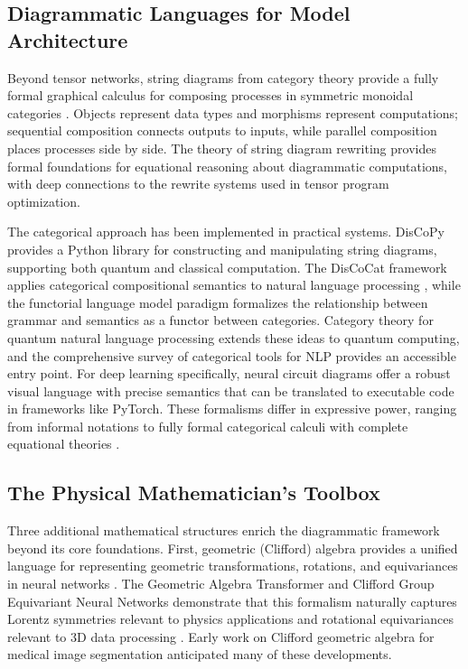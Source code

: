 \documentclass[12pt,a4paper]{article}
\begin{document}
\subsection{Diagrammatic Languages for Model Architecture}

Beyond tensor networks, string diagrams from category theory provide a fully formal graphical calculus for composing processes in symmetric monoidal categories \cite{marsden2014category}. Objects represent data types and morphisms represent computations; sequential composition connects outputs to inputs, while parallel composition places processes side by side. The theory of string diagram rewriting \cite{acclaviondstring} provides formal foundations for equational reasoning about diagrammatic computations, with deep connections to the rewrite systems used in tensor program optimization.

The categorical approach has been implemented in practical systems. DisCoPy \cite{toumi2022discopy} provides a Python library for constructing and manipulating string diagrams, supporting both quantum and classical computation. The DisCoCat framework applies categorical compositional semantics to natural language processing \cite{sadrzadeh2016quantifier, kartsaklis2016coordination}, while the functorial language model paradigm \cite{toumi2021functorial} formalizes the relationship between grammar and semantics as a functor between categories. Category theory for quantum natural language processing \cite{toumi2022category} extends these ideas to quantum computing, and the comprehensive survey of categorical tools for NLP \cite{felice2022categorical} provides an accessible entry point. For deep learning specifically, neural circuit diagrams \cite{abbott2024neural} offer a robust visual language with precise semantics that can be translated to executable code in frameworks like PyTorch. These formalisms differ in expressive power, ranging from informal notations to fully formal categorical calculi with complete equational theories \cite{bonchi2020stringdr, bonchi2021stringdr}.

\subsection{The Physical Mathematician's Toolbox}

Three additional mathematical structures enrich the diagrammatic framework beyond its core foundations. First, geometric (Clifford) algebra provides a unified language for representing geometric transformations, rotations, and equivariances in neural networks \cite{ruhe2023geometric}. The Geometric Algebra Transformer and Clifford Group Equivariant Neural Networks demonstrate that this formalism naturally captures Lorentz symmetries relevant to physics applications and rotational equivariances relevant to 3D data processing \cite{spinner2024lorentzequivariant, brehmer2024a}. Early work on Clifford geometric algebra for medical image segmentation \cite{riverarovelondmedical} anticipated many of these developments.
\end{document}
